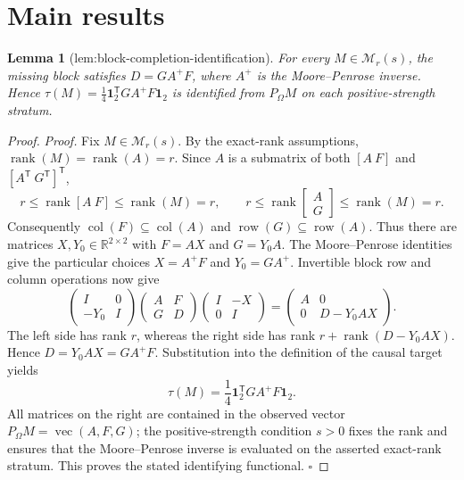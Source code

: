 \documentclass{article}
\newtheorem{lemma}{Lemma}
\begin{document}
\section{Main results}

\begin{lemma}[lem:block-completion-identification]\label{lem:block-completion-identification}
For every \(M\in\mathcal M_r(s)\), the missing block satisfies \(D=GA^{+}F\), where \(A^{+}\) is the Moore--Penrose inverse. Hence \(\tau(M)=\tfrac14\mathbf 1_2^{\mathsf T}GA^{+}F\mathbf 1_2\) is identified from \(P_{\Omega}M\) on each positive-strength stratum.
\end{lemma}
\begin{proof}
\textit{Proof.}
Fix \(M\in\mathcal M_r(s)\).  By the exact-rank assumptions,
\(\operatorname{rank}(M)=\operatorname{rank}(A)=r\).  Since \(A\) is a
submatrix of both \([A\ F]\) and \([A^{\mathsf T}\ G^{\mathsf T}]^{\mathsf T}\),
\[
r\leq \operatorname{rank}[A\ F]\leq \operatorname{rank}(M)=r,
\qquad
r\leq \operatorname{rank}\!\begin{bmatrix}A\\G\end{bmatrix}
\leq \operatorname{rank}(M)=r.
\]
Consequently \(\operatorname{col}(F)\subseteq\operatorname{col}(A)\) and
\(\operatorname{row}(G)\subseteq\operatorname{row}(A)\).  Thus there are
matrices \(X,Y_0\in\mathbb R^{2\times2}\) with \(F=AX\) and \(G=Y_0A\).
The Moore--Penrose identities give the particular choices
\(X=A^+F\) and \(Y_0=GA^+\).  Invertible block row and column operations now give
\[
\begin{pmatrix}I&0\\-Y_0&I\end{pmatrix}
\begin{pmatrix}A&F\\G&D\end{pmatrix}
\begin{pmatrix}I&-X\\0&I\end{pmatrix}
=
\begin{pmatrix}A&0\\0&D-Y_0AX\end{pmatrix}.
\]
The left side has rank \(r\), whereas the right side has rank
\(r+\operatorname{rank}(D-Y_0AX)\).  Hence \(D=Y_0AX=GA^+F\).
Substitution into the definition of the causal target yields
\[
\tau(M)=\frac14\mathbf 1_2^{\mathsf T}GA^+F\mathbf 1_2.
\]
All matrices on the right are contained in the observed vector
\(P_{\Omega}M=\operatorname{vec}(A,F,G)\); the positive-strength condition
\(s>0\) fixes the rank and ensures that the Moore--Penrose inverse is evaluated
on the asserted exact-rank stratum.  This proves the stated identifying
functional. \(\square\)
\end{proof}
\end{document}
